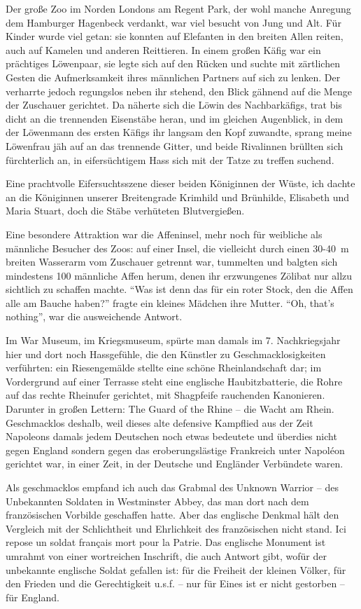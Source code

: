 \documentclass[a5paper,pagesize,10pt,twoside=true]{scrbook}
\begin{document}
Der große Zoo im Norden Londons am Regent Park, der wohl manche Anregung dem Hamburger Hagenbeck verdankt, war viel besucht von Jung und Alt. Für Kinder wurde viel getan: sie konnten auf Elefanten in den breiten Allen reiten, auch auf Kamelen und anderen Reittieren. In einem großen Käfig war ein prächtiges Löwenpaar, sie legte sich auf den Rücken und suchte mit zärtlichen Gesten die Aufmerksamkeit ihres männlichen Partners auf sich zu lenken. Der verharrte jedoch regungslos neben ihr stehend, den Blick gähnend auf die Menge der Zuschauer gerichtet. Da näherte sich die Löwin des Nachbarkäfigs, trat bis dicht an die trennenden Eisenstäbe heran, und im gleichen Augenblick, in dem der Löwenmann des ersten Käfigs ihr langsam den Kopf zuwandte, sprang meine Löwenfrau jäh auf an das trennende Gitter, und beide Rivalinnen brüllten sich fürchterlich an, in eifersüchtigem Hass sich mit der Tatze zu treffen suchend.

Eine prachtvolle Eifersuchtsszene dieser beiden Königinnen der Wüste, ich dachte an die Königinnen unserer Breitengrade Krimhild und Brünhilde, Elisabeth und Maria Stuart, doch die Stäbe verhüteten Blutvergießen.

Eine besondere Attraktion war die Affeninsel, mehr noch für weibliche als männliche Besucher des Zoos: auf einer Insel, die vielleicht durch einen 30-40~m breiten Wasserarm vom Zuschauer getrennt war, tummelten und balgten sich mindestens 100 männliche Affen herum, denen ihr erzwungenes Zölibat nur allzu sichtlich zu schaffen machte. \enquote{Was ist denn das für ein roter Stock, den die Affen alle am Bauche haben?} fragte ein kleines Mädchen ihre Mutter. \enquote{Oh, that's nothing}, war die ausweichende Antwort.

Im War Museum, im Kriegsmuseum, spürte man damals im 7. Nachkriegsjahr hier und dort noch Hassgefühle, die den Künstler zu Geschmacklosigkeiten verführten: ein Riesengemälde stellte eine schöne Rheinlandschaft dar; im Vordergrund auf einer Terrasse steht eine englische Haubitzbatterie, die Rohre auf das rechte Rheinufer gerichtet, mit Shagpfeife rauchenden Kanonieren. Darunter in großen Lettern: The Guard of the Rhine -- die Wacht am Rhein. Geschmacklos deshalb, weil dieses alte defensive Kampflied aus der Zeit Napoleons damals jedem Deutschen noch etwas bedeutete und überdies nicht gegen England sondern gegen das eroberungslästige Frankreich unter Napoléon gerichtet war, in einer Zeit, in der Deutsche und Engländer Verbündete waren.

Als geschmacklos empfand ich auch das Grabmal des Unknown Warrior -- des Unbekannten Soldaten in Westminster Abbey, das man dort nach dem französischen Vorbilde geschaffen hatte. Aber das englische Denkmal hält den Vergleich mit der Schlichtheit und Ehrlichkeit des französischen nicht stand. Ici repose un soldat français mort pour la Patrie. Das englische Monument ist umrahmt von einer wortreichen Inschrift, die auch Antwort gibt, wofür der unbekannte englische Soldat gefallen ist: für die Freiheit der kleinen Völker, für den Frieden und die Gerechtigkeit u.s.f. -- nur für Eines ist er nicht gestorben -- für England.
\end{document}

